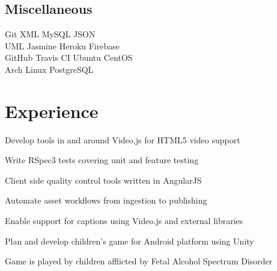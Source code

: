 \documentclass[]{deedy-resume-openfont}
\begin{document}
\begin{minipage}[t]{0.33\textwidth}
\subsection{Miscellaneous}
Git \textbullet{} XML \textbullet{} MySQL \textbullet{} JSON \\ 
UML \textbullet{} Jasmine \textbullet{}
Heroku \textbullet{} Firebase \\
GitHub \textbullet{} Travis CI \textbullet{} Ubuntu \textbullet{} CentOS \\
Arch Linux \textbullet{} PostgreSQL
\sectionsep

%
%

\end{minipage} 
\hfill
\begin{minipage}[t]{0.66\textwidth}


\section{Experience}

\vspace{\topsep} %
\begin{tightemize}
\item Develop tools in and around Video.js for HTML5 video support
\item Write RSpec3 tests covering unit and feature testing
\item Client side quality control tools written in AngularJS
\item Automate asset workflows from ingestion to publishing
\item Enable support for captions using Video.js and external libraries
\end{tightemize}
\sectionsep

\begin{tightemize}
\item Plan and develop children's game for Android platform using Unity
\item Game is played by children afflicted by Fetal Alcohol Spectrum Disorder
\end{tightemize}
\sectionsep


\end{minipage}
\end{document}
